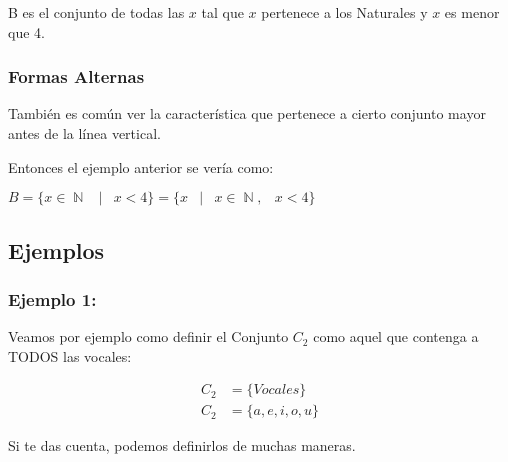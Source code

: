 \documentclass[12pt]{report}                                    %
\DeclareMathOperator \Space {\quad}                             %
\DeclareMathOperator \MiniSpace {\;}                            %
\newcommand \Such {\MiniSpace|\MiniSpace}                       %
\DeclareMathOperator \Naturals  {\mathbb{N}}                     %
\begin{document}
                        B es el conjunto de todas las $x$ tal que $x$ pertenece a los Naturales
                        y $x$ es menor que 4.


                    \subsubsection*{Formas Alternas}
                    
                        También es común ver la característica que pertenece a cierto conjunto mayor
                        antes de la línea vertical.

                        Entonces el ejemplo anterior se vería como:

                        $B = \{ x \in \Naturals \Such x < 4 \} = \{ x \Such x \in \Naturals, \MiniSpace x < 4 \} $


                    
                \clearpage
                \subsection{Ejemplos} 

                \subsubsection*{Ejemplo 1:}

                    Veamos por ejemplo como definir el Conjunto $C_2$ como aquel que contenga a
                    TODOS las vocales:

                    \begin{equation*}   
                    \begin{split}   
                        C_2 &= \{ Vocales \}       \\
                        C_2 &= \{a, e, i, o, u \}
                    \end{split}   
                    \end{equation*}

                    Si te das cuenta, podemos definirlos de muchas maneras.


\end{document}
